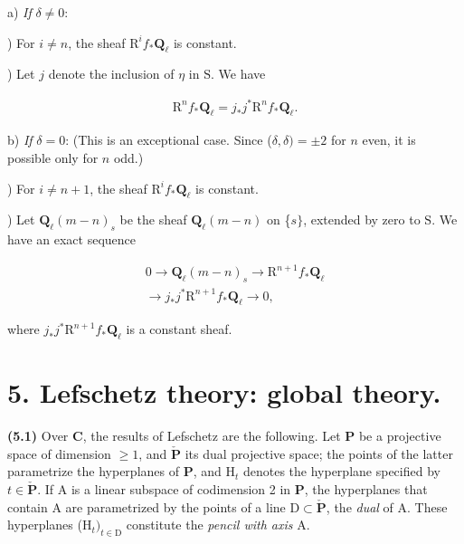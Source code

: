 \documentclass[10pt,leqno]{article}
\begin{document}
\noindent a) \emph{If} \(\delta \ne 0\):\par

) For \(i\ne n\), the sheaf \(\mathrm{R}^{i} f_{*}\mathbf{Q}_{\ell }\) is constant.\par

) Let \(j\) denote the inclusion of \(\eta \) in \(\mathrm{S}\). We have\par

\begin{equation*}\begin{gathered}\mathrm{R}^{n} f_{*}\mathbf{Q}_{\ell } = j_{*}j^{*}\mathrm{R}^{n} f_{*}\mathbf{Q}_{\ell }.\end{gathered}\end{equation*}

\noindent b) \emph{If} \(\delta =0\): (This is an exceptional case. Since (\(\delta ,\delta )=\pm 2\) for \(n\) even, it is possible only for \(n\) odd.)\par

) For \(i\ne n+1\), the sheaf \(\mathrm{R}^{i} f_{*}\mathbf{Q}_{\ell }\) is constant.\par

) Let \(\mathbf{Q}_{\ell }(m- n)_{s}\) be the sheaf \(\mathbf{Q}_{\ell }(m- n)\) on \{\(s\}\), extended by zero to \(\mathrm{S}\). We have an exact sequence\par

\begin{equation*}\begin{gathered}0 \longrightarrow  \mathbf{Q}_{\ell }(m- n)_{s} \longrightarrow  \mathrm{R}^{n+1}f_{*}\mathbf{Q}_{\ell } \\ \longrightarrow  j_{*}j^{*}\mathrm{R}^{n+1}f_{*}\mathbf{Q}_{\ell } \longrightarrow  0,\end{gathered}\end{equation*}

\noindent where \(j_{*}j^{*}\mathrm{R}^{n+1}f_{*}\mathbf{Q}_{\ell }\) is a constant sheaf.\par

\section*{5. Lefschetz theory: global theory.}

\noindent \textbf{(5.1)} Over \(\mathbf{C}\), the results of Lefschetz are the following. Let \(\mathbf{P}\) be a projective space of dimension \(\geq 1\), and \(\check{\mathbf{P}}\) its dual projective space; the points of the latter parametrize the hyperplanes of \(\mathbf{P}\), and \(\mathrm{H}_{t}\) denotes the hyperplane specified by \(t\in \check{\mathbf{P}}\). If \(\mathrm{A}\) is a linear subspace of codimension 2 in \(\mathbf{P}\), the hyperplanes that contain \(\mathrm{A}\) are parametrized by the points of a line \(\mathrm{D}\subset \check{\mathbf{P}}\), the \emph{dual} of \(\mathrm{A}\). These hyperplanes (\(\mathrm{H}_{t})_{t\in \mathrm{D}}\) constitute the \emph{pencil with axis} \(\mathrm{A}\).\par
\end{document}

